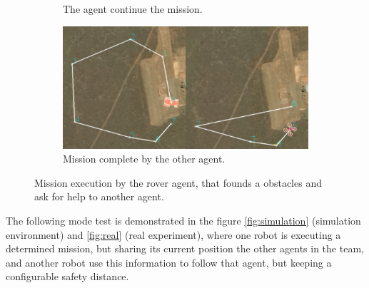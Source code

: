 \begin{figure}
\begin{subfigure}[b]{0.9\columnwidth}
    \caption{The agent continue the mission.}
  \end{subfigure}
  \begin{subfigure}[b]{0.9\columnwidth}
    \includegraphics[width=\textwidth]{img/mission10.png}
    \caption{Mission complete by the other agent.}
  \end{subfigure}

  \caption{Mission execution by the rover agent, that founds a obstacles and ask for help to another agent.}
  \label{fig:simulation_mission}
\end{figure}

The following mode test is demonstrated in the figure \ref{fig:simulation} (simulation environment) and \ref{fig:real} (real experiment), where one robot is executing a determined mission, but sharing its current position the other agents in the team, and another robot use this information to follow that agent, but keeping a configurable safety distance.


